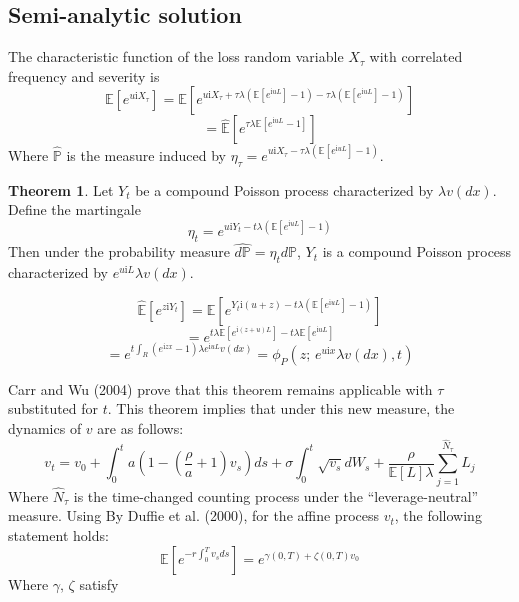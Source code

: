 \documentclass{article}
\theoremstyle{definition}
\newtheorem{theorem}{Theorem}
\newenvironment{sketchproof}{%
  \renewcommand{\proofname}{Sketch of Proof}\proof}{\endproof}
\begin{document}
\subsection{Semi-analytic solution}
The characteristic function of the loss random variable \(X_\tau\) with correlated frequency and severity is 
\[\mathbb{E}[e^{u\mathrm{i}X_\tau}]=\mathbb{E}\left[e^{u\mathrm{i}X_\tau+ \tau \lambda  \left(\mathbb{E}\left[e^{\mathrm{i}uL}\right]-1\right)- \tau \lambda \left(\mathbb{E}\left[e^{\mathrm{i}uL}\right]-1\right)}\right]\]
\[=\mathbb{\hat{E}} \left[e^{\tau \lambda \mathbb{E}\left[e^{\mathrm{i}uL}-1\right]}\right]\]
Where \(\mathbb{\hat{P}}\) is the measure induced by \(\eta_\tau=e^{u\mathrm{i}X_\tau- \tau\lambda \left(\mathbb{E}\left[e^{\mathrm{i}uL}\right]-1\right)}\).  
\begin{theorem}\label{theorem1}
Let \(Y_t\) be a compound Poisson process characterized by \(\lambda v(dx)\).  Define the martingale
\begin{equation}\eta_t=e^{u\mathrm{i}Y_t- t\lambda \left(\mathbb{E}\left[e^{\mathrm{i}uL}\right]-1\right)}\end{equation}
Then under the probability measure \(\hat{d\mathbb{P}}=\eta_t d\mathbb{P}\), \(Y_t\) is a compound Poisson process characterized by \(e^{u\mathrm{i}L}\lambda v(dx)\).
\end{theorem}
\begin{sketchproof}
\[\mathbb{\hat{E}}\left[e^{z\mathrm{i}Y_t}\right]=\mathbb{E}\left[e^{Y_t \mathrm{i} (u+z)-t\lambda \left(\mathbb{E}\left[e^{\mathrm{i}uL}\right]-1\right)}\right]\]
\[=e^{t\lambda \mathbb{E}\left[e^{\mathrm{i}(z+u)L}\right]-t\lambda \mathbb{E}\left[e^{\mathrm{i}uL}\right]}\]
\[=e^{t \int_{R} \left(e^{\mathrm{i}zx}-1\right)\lambda e^{\mathrm{i}uL}v(dx)}=\phi_{P} (z;\,e^{u\mathrm{i}x}\lambda v(dx), t)\]
\end{sketchproof}

Carr and Wu (2004) prove that this theorem remains applicable with \(\tau\) substituted for \(t\).  This theorem implies that under this new measure, the dynamics of \(v\) are as follows:
\begin{equation}\label{tmcLN}v_t=v_0+\int_0 ^t a\left(1-\left(\frac{\rho}{a}+1\right)v_s\right)ds+\sigma \int_0 ^ t \sqrt{v_s} dW_s +\frac{\rho}{\mathbb{E}[L] \lambda} \sum_{j=1} ^ {\hat{N}_\tau} L_j \end{equation}
Where \(\hat{N}_\tau\) is the time-changed counting process under the ``leverage-neutral'' measure.   Using By Duffie et al. (2000), for the affine process \(v_t\), the following statement holds:
\[\mathbb{E} \left[e^{-r\int_0 ^ {T} v_s ds}\right]=e^{\gamma(0, T)+\zeta(0, T)v_0}\]
Where \(\gamma,\,\zeta\) satisfy
\end{document}
